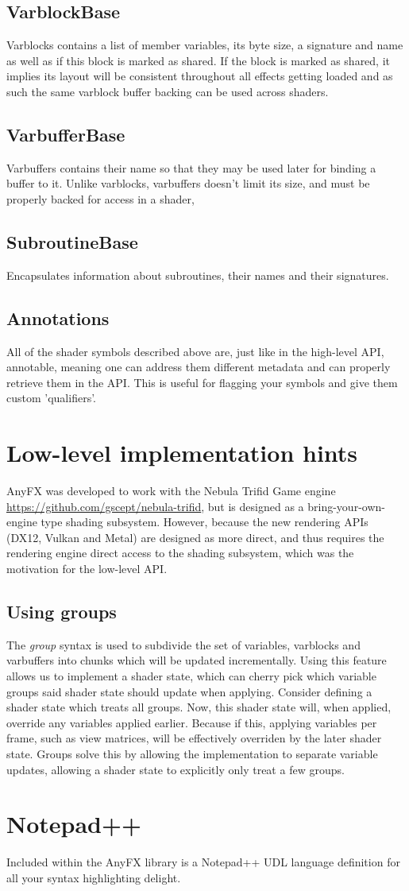 \documentclass{article}
\begin{document}
\subsection{VarblockBase}
Varblocks contains a list of member variables, its byte size, a signature and name as well as if this block is marked as shared. If the block is marked as shared, it implies its layout will be consistent throughout all effects getting loaded and as such the same varblock buffer backing can be used across shaders. 

\subsection{VarbufferBase}
Varbuffers contains their name so that they may be used later for binding a buffer to it. Unlike varblocks, varbuffers doesn't limit its size, and must be properly backed for access in a shader,

\subsection{SubroutineBase}
Encapsulates information about subroutines, their names and their signatures.

\subsection{Annotations}
All of the shader symbols described above are, just like in the high-level API, annotable, meaning one can address them different metadata and can properly retrieve them in the API. This is useful for flagging your symbols and give them custom 'qualifiers'. 

\clearpage
\section{Low-level implementation hints}
AnyFX was developed to work with the Nebula Trifid Game engine \url{https://github.com/gscept/nebula-trifid}, but is designed as a bring-your-own-engine type shading subsystem. However, because the new rendering APIs (DX12, Vulkan and Metal) are designed as more direct, and thus requires the rendering engine direct access to the shading subsystem, which was the motivation for the low-level API.

\subsection{Using groups}
The \textit{group} syntax is used to subdivide the set of variables, varblocks and varbuffers into chunks which will be updated incrementally. Using this feature allows us to implement a shader state, which can cherry pick which variable groups said shader state should update when applying. Consider defining a shader state which treats all groups. Now, this shader state will, when applied, override any variables applied earlier. Because if this, applying variables per frame, such as view matrices, will be effectively overriden by the later shader state. Groups solve this by allowing the implementation to separate variable updates, allowing a shader state to explicitly only treat a few groups.

\clearpage
\section{Notepad++}
Included within the AnyFX library is a Notepad++ UDL language definition for all your syntax highlighting delight. 
\end{document}

